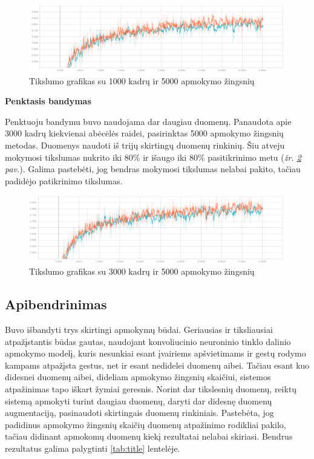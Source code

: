 \documentclass{VUMIFInfKursinis}
\begin{document}
\begin{figure}[H]
	\centering
	\includegraphics[width=.8\linewidth]{img/accuracy3}
	\caption{Tikslumo grafikas su 1000 kadrų ir 5000 apmokymo žingsnių}
	\label{img:acc3}
\end{figure}

\textbf{Penktasis bandymas}

Penktuoju bandymu buvo naudojama dar daugiau duomenų. Panaudota apie 3000 kadrų kiekvienai abėcėlės raidei, pasirinktas 5000 apmokymo žingsnių metodas. Duomenys naudoti iš trijų skirtingų duomenų rinkinių. Šiu atveju mokymosi tikslumas nukrito iki 80\% ir išaugo iki 80\% pasitikrinimo metu (\textit{žr. \ref{img:acc4} pav.}). Galima pastebėti, jog bendras mokymosi tikslumas nelabai pakito, tačiau padidėjo patikrinimo tikslumas.

\begin{figure}[H]
	\centering
	\includegraphics[width=.8\linewidth]{img/accuracy4}
	\caption{Tikslumo grafikas su 3000 kadrų ir 5000 apmokymo žingsnių}
	\label{img:acc4}
\end{figure}

\subsection{Apibendrinimas}
Buvo išbandyti trys skirtingi apmokymų būdai. Geriausias ir tiksliausiai atpažįstantis būdas gautas, naudojant konvoliucinio neuroninio tinklo dalinio apmokymo modelį, kuris nesunkiai esant įvairiems apšvietimams ir gestų rodymo kampams atpažįsta gestus, net ir esant nedidelei duomenų aibei. Tačiau esant kuo didesnei duomenų aibei, dideliam apmokymo žingsnių skaičiui, sistemos atpažinimas tapo iškart žymiai geresnis. Norint dar tikslesnių duomenų, reiktų sistemą apmokyti turint daugiau duomenų, daryti dar didesnę duomenų augmentaciją, pasinaudoti skirtingais duomenų rinkiniais. Pastebėta, jog padidinus apmokymo žingsnių skaičių duomenų atpažinimo rodikliai pakilo, tačiau didinant apmokomų duomenų kiekį rezultatai nelabai skiriasi. Bendrus rezultatus galima palygtinti \ref{tab:title} lentelėje.
\end{document}
